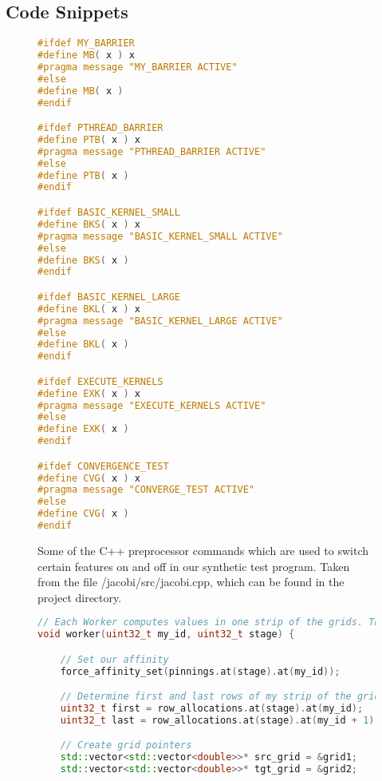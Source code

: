 
\begin{appendices}

\chapter{Code Snippets}
\label{appendix:code_snippets}

\begin{figure}
\begin{lstlisting}[language=C++]
#ifdef MY_BARRIER
#define MB( x ) x
#pragma message "MY_BARRIER ACTIVE"
#else
#define MB( x )
#endif

#ifdef PTHREAD_BARRIER
#define PTB( x ) x
#pragma message "PTHREAD_BARRIER ACTIVE"
#else
#define PTB( x )
#endif

#ifdef BASIC_KERNEL_SMALL
#define BKS( x ) x
#pragma message "BASIC_KERNEL_SMALL ACTIVE"
#else
#define BKS( x )
#endif

#ifdef BASIC_KERNEL_LARGE
#define BKL( x ) x
#pragma message "BASIC_KERNEL_LARGE ACTIVE"
#else
#define BKL( x )
#endif

#ifdef EXECUTE_KERNELS
#define EXK( x ) x
#pragma message "EXECUTE_KERNELS ACTIVE"
#else
#define EXK( x )
#endif

#ifdef CONVERGENCE_TEST
#define CVG( x ) x
#pragma message "CONVERGE_TEST ACTIVE"
#else
#define CVG( x )
#endif
\end{lstlisting}
\caption{Some of the C++ preprocessor commands which are used to switch certain features on and off in our synthetic test program. Taken from the file /jacobi/src/jacobi.cpp, which can be found in the project directory.}
\label{fig:preprocessor}
\end{figure}



\begin{figure}
\begin{lstlisting}[language=C++]
// Each Worker computes values in one strip of the grids. The main worker loop does two computations to avoid copying from one grid to the other
void worker(uint32_t my_id, uint32_t stage) {

	// Set our affinity
	force_affinity_set(pinnings.at(stage).at(my_id));

	// Determine first and last rows of my strip of the grids
	uint32_t first = row_allocations.at(stage).at(my_id);
	uint32_t last = row_allocations.at(stage).at(my_id + 1);

	// Create grid pointers
	std::vector<std::vector<double>>* src_grid = &grid1;
	std::vector<std::vector<double>>* tgt_grid = &grid2;


\end{lstlisting}
\end{figure}
\end{appendices}
